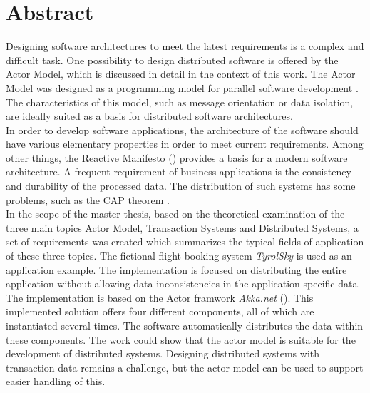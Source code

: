
\chapter*{Abstract}
Designing software architectures to meet the latest requirements is a complex and difficult task. One possibility to design distributed software is offered by the Actor Model, which is discussed in detail in the context of this work. The Actor Model was designed as a programming model for parallel software development \citep{hewitt1973session}. The characteristics of this model, such as message orientation or data isolation, are ideally suited as a basis for distributed software architectures. \\
In order to develop software applications, the architecture of the software should have various elementary properties in order to meet current requirements. Among other things, the Reactive Manifesto (\cite{reactiveManifesto}) provides a basis for a modern software architecture. 
A frequent requirement of business applications is the consistency and durability of the processed data. The distribution of such systems has some problems, such as the CAP theorem \citep{gilbertPerspectiveCAPTheorem2012}. \\
In the scope of the master thesis, based on the theoretical examination of the three main topics Actor Model, Transaction Systems and Distributed Systems, a set of requirements was created which summarizes the typical fields of application of these three topics. The fictional flight booking system \textit{TyrolSky} is used as an application example. The implementation is focused on distributing the entire application without allowing data inconsistencies in the application-specific data. \\
The implementation is based on the Actor framwork \textit{Akka.net} (\cite{Akka.netCommunityAkka.NETDocumentation}). This implemented solution offers four different components, all of which are instantiated several times. The software automatically distributes the data within these components.
The work could show that the actor model is suitable for the development of distributed systems. Designing distributed systems with transaction data remains a challenge, but the actor model can be used to support easier handling of this.


\cleardoublepage
{} %